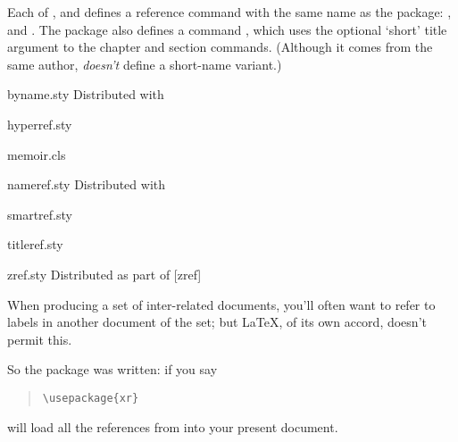 Each of ,  and 
defines a reference command with the same name as the package:
,  and . The 
package also defines a command , which uses the
optional `short' title argument to the chapter and section commands.
(Although it comes from the same author,  \emph{doesn't}
define a short-name variant.)
\begin{ctanrefs}
\item[byname.sty]Distributed with 
\item[hyperref.sty]
\item[memoir.cls]
\item[nameref.sty]Distributed with 
\item[smartref.sty]
\item[titleref.sty]
\item[zref.sty]Distributed as part of [zref]
\end{ctanrefs}


When producing a set of inter-related documents, you'll often want to
refer to labels in another document of the set; but \LaTeX{}, of its
own accord, doesn't permit this.

So the package  was written: if you say
\begin{quote}
\begin{verbatim}
\usepackage{xr}

\end{verbatim}
\end{quote}
will load all the references from  into your present
document.

